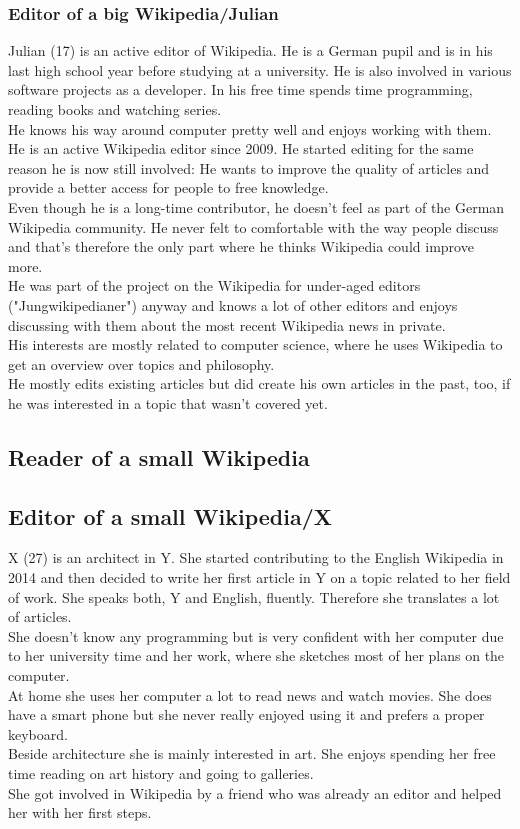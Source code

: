 \documentclass[11pt]{article}
\begin{document}
\subsubsection{Editor of a big Wikipedia/Julian}
Julian (17) is an active editor of Wikipedia. He is a German pupil and is in his last high school year before studying at a university. He is also involved in various software projects as a developer. In his free time spends time programming, reading books and watching series. \\
He knows his way around computer pretty well and enjoys working with them. \\
He is an active Wikipedia editor since 2009. He started editing for the same reason he is now still involved: He wants to improve the quality of articles and provide a better access for people to free knowledge. \\
Even though he is a long-time contributor, he doesn't feel as part of the German Wikipedia community. He never felt to comfortable with the way people discuss and that's therefore the only part where he thinks Wikipedia could improve more. \\
He was part of the project on the Wikipedia for under-aged editors ("Jungwikipedianer") anyway and knows a lot of other editors and enjoys discussing with them about the most recent Wikipedia news in private. \\
His interests are mostly related to computer science, where he uses Wikipedia to get an overview over topics and philosophy. \\
He mostly edits existing articles but did create his own articles in the past, too, if he was interested in a topic that wasn't covered yet.  



\subsection{Reader of a small Wikipedia}

\subsection{Editor of a small Wikipedia/X}
X (27) is an architect in Y. She started contributing to the English Wikipedia in 2014 and then decided to write her first article in Y on a topic related to her field of work. She speaks both, Y and English, fluently. Therefore she translates a lot of articles. \\
She doesn't know any programming but is very confident with her computer due to her university time and her work, where she sketches most of her plans on the computer. \\
At home she uses her computer a lot to read news and watch movies. She does have a smart phone but she never really enjoyed using it and prefers a proper keyboard. \\  
Beside architecture she is mainly interested in art. She enjoys spending her free time reading on art history and going to galleries. \\
She got involved in Wikipedia by a friend who was already an editor and helped her with her first steps.
\end{document}
